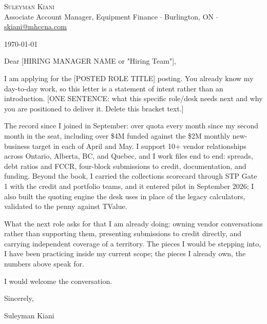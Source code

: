 \documentclass[letterpaper,11pt]{article}
\newcommand{\role}{[POSTED ROLE TITLE]}
\newcommand{\hiringmgr}{[HIRING MANAGER NAME or "Hiring Team"]}
\newcommand{\hook}{[ONE SENTENCE: what this specific role/desk needs next and why you are positioned to deliver it. Delete this bracket text.]}
\begin{document}
\begin{center}
    {\Huge \scshape Suleyman Kiani} \\ \vspace{3pt}
    \small Associate Account Manager, Equipment Finance $\cdot$ Burlington, ON $\cdot$ \href{mailto:skiani@mhccna.com}{\underline{skiani@mhccna.com}}
\end{center}

\vspace{8pt}
\today

Dear \hiringmgr,

I am applying for the \role{} posting. You already know my day-to-day work, so this letter is a statement of intent rather than an introduction. \hook{}

The record since I joined in September: over quota every month since my second month in the seat, including over \$4M funded against the \$2M monthly new-business target in each of April and May. I support 10+ vendor relationships across Ontario, Alberta, BC, and Quebec, and I work files end to end: spreads, debt ratios and FCCR, four-block submissions to credit, documentation, and funding. Beyond the book, I carried the collections scorecard through STP Gate 1 with the credit and portfolio teams, and it entered pilot in September 2026; I also built the quoting engine the desk uses in place of the legacy calculators, validated to the penny against TValue.

What the next role asks for that I am already doing: owning vendor conversations rather than supporting them, presenting submissions to credit directly, and carrying independent coverage of a territory. The pieces I would be stepping into, I have been practicing inside my current scope; the pieces I already own, the numbers above speak for.

I would welcome the conversation. %

Sincerely,

Suleyman Kiani
\end{document}
